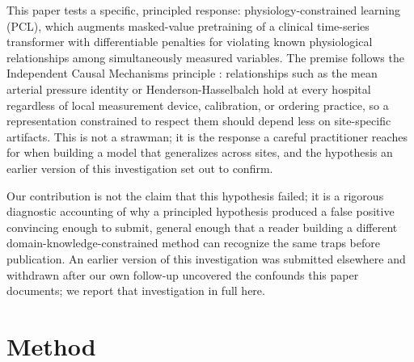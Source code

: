 \documentclass[pmlr,twocolumn,10pt]{jmlr} %
\begin{document}
This paper tests a specific, principled response: physiology-constrained
learning (PCL), which augments masked-value pretraining of a clinical
time-series transformer with differentiable penalties for violating known
physiological relationships among simultaneously measured variables. The
premise follows the Independent Causal Mechanisms principle
\citep{scholkopf2021toward}: relationships such as the mean arterial
pressure identity or Henderson-Hasselbalch hold at every hospital
regardless of local measurement device, calibration, or ordering practice,
so a representation constrained to respect them should depend less on
site-specific artifacts. This is not a strawman; it is the response a
careful practitioner reaches for when building a model that generalizes
across sites, and the hypothesis an earlier version of this investigation
set out to confirm.

Our contribution is not the claim that this hypothesis failed; it is a
rigorous diagnostic accounting of why a principled hypothesis produced a
false positive convincing enough to submit, general enough that a reader
building a different domain-knowledge-constrained method can recognize the
same traps before publication. An earlier version of this investigation was
submitted elsewhere and withdrawn after our own follow-up uncovered the
confounds this paper documents; we report that investigation in full here.

\section{Method}
\label{sec:method}
\end{document}
